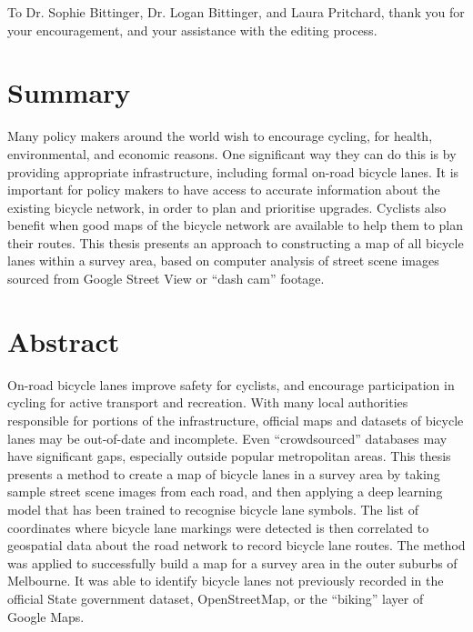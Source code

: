 \documentclass[11pt,twoside]{report}
\begin{document}
To Dr. Sophie Bittinger, Dr. Logan Bittinger, and Laura Pritchard, thank you for your encouragement, and your assistance with the editing process.


\chapter*{Summary}

Many policy makers around the world wish to encourage cycling, for health, environmental, and economic reasons.  One significant way they can do this is by providing appropriate infrastructure, including formal on-road bicycle lanes.  It is important for policy makers to have access to accurate information about the existing bicycle network, in order to plan and prioritise upgrades.  Cyclists also benefit when good maps of the bicycle network are available to help them to plan their routes.  This thesis presents an approach to constructing a map of all bicycle lanes within a survey area, based on computer analysis of street scene  images sourced from Google Street View or ``dash cam'' footage.

\chapter*{Abstract}

On-road bicycle lanes improve safety for cyclists, and encourage participation in cycling for active transport and recreation.  With many local authorities responsible for portions of the infrastructure, official maps and datasets of bicycle lanes may be out-of-date and incomplete.  Even ``crowdsourced'' databases may have significant gaps, especially outside popular metropolitan areas.  This thesis presents a method to create a map of bicycle lanes in a survey area by taking sample street scene images from each road,  and then applying a deep learning model that has been trained to recognise bicycle lane symbols.  The list of coordinates where bicycle lane markings were detected is then correlated to geospatial data about the road network to record bicycle lane routes.  The method was applied to successfully build a map for a survey area in the outer suburbs of Melbourne.  It was able to identify bicycle lanes not previously recorded in the official State government dataset, OpenStreetMap, or the ``biking'' layer of Google Maps.
\end{document}
